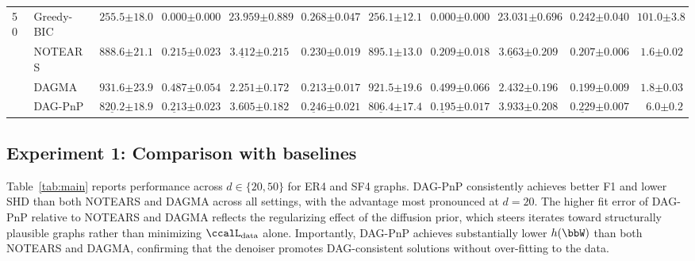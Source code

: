 \documentclass[conference]{IEEEtran}
\newcommand{\Ldata}{\ccalL_{\mathrm{data}}}
\newcommand{\sms}[1]{{\color{cyan}{[SS: #1]}}}
\begin{document}
\begin{table}[t]
\begin{tabular}{llccccccccr}
    \midrule
    \multirow{4}{*}{50}
    & Greedy-BIC & $\mathbf{255.5}{\scriptscriptstyle \pm18.0}$ & $\mathbf{0.000}{\scriptscriptstyle \pm0.000}$ & $23.959{\scriptscriptstyle \pm0.889}$ & $\mathbf{0.268}{\scriptscriptstyle \pm0.047}$
                 & $\mathbf{256.1}{\scriptscriptstyle \pm12.1}$ & $\mathbf{0.000}{\scriptscriptstyle \pm0.000}$ & $23.031{\scriptscriptstyle \pm0.696}$ & $\mathbf{0.242}{\scriptscriptstyle \pm0.040}$ & $101.0{\scriptscriptstyle \pm3.8}$  \\
      & NOTEARS  & $888.6{\scriptscriptstyle \pm21.1}$ & $0.215{\scriptscriptstyle \pm0.023}$ & $\underline{3.412}{\scriptscriptstyle \pm0.215}$ & $0.230{\scriptscriptstyle \pm0.019}$
                 & $895.1{\scriptscriptstyle \pm13.0}$ & $0.209{\scriptscriptstyle \pm0.018}$ & $\underline{3.663}{\scriptscriptstyle \pm0.209}$ & $0.207{\scriptscriptstyle \pm0.006}$ & $1.6{\scriptscriptstyle \pm0.02}$   \\
      & DAGMA    & $931.6{\scriptscriptstyle \pm23.9}$ & $0.487{\scriptscriptstyle \pm0.054}$ & $\mathbf{2.251}{\scriptscriptstyle \pm0.172}$ & $0.213{\scriptscriptstyle \pm0.017}$
                 & $921.5{\scriptscriptstyle \pm19.6}$ & $0.499{\scriptscriptstyle \pm0.066}$ & $\mathbf{2.432}{\scriptscriptstyle \pm0.196}$ & $0.199{\scriptscriptstyle \pm0.009}$ & $1.8{\scriptscriptstyle \pm0.03}$   \\
      & DAG-PnP  & $\underline{820.2}{\scriptscriptstyle \pm18.9}$ & $\underline{0.213}{\scriptscriptstyle \pm0.023}$ & $3.605{\scriptscriptstyle \pm0.182}$ & $\underline{0.246}{\scriptscriptstyle \pm0.021}$
                 & $\underline{806.4}{\scriptscriptstyle \pm17.4}$ & $\underline{0.195}{\scriptscriptstyle \pm0.017}$ & $3.933{\scriptscriptstyle \pm0.208}$ & $\underline{0.229}{\scriptscriptstyle \pm0.007}$ & $6.0{\scriptscriptstyle \pm0.2}$ \\
    \bottomrule
  \end{tabular}
\end{table}
    
    \subsection{Experiment 1: Comparison with baselines}
    \label{ssec:exp1}
    
    Table~\ref{tab:main} reports performance across $d \in \{20, 50\}$
    for ER4 and SF4 graphs. DAG-PnP consistently achieves better F1 and
    lower SHD than both NOTEARS and DAGMA across all settings, with the
    advantage most pronounced at $d=20$. The higher fit error of DAG-PnP
    relative to NOTEARS and DAGMA reflects the regularizing effect of the
    diffusion prior, which steers iterates toward structurally plausible
    graphs rather than minimizing $\Ldata$ alone. Importantly, DAG-PnP
    achieves substantially lower $h(\bbW)$ than both NOTEARS and DAGMA,
    confirming that the denoiser promotes DAG-consistent solutions without
    over-fitting to the data.
    
\end{document}
